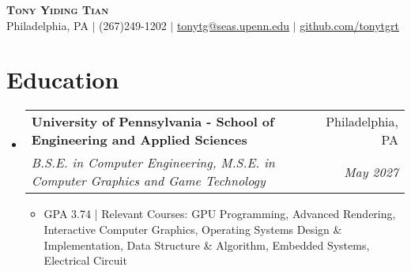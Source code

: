 \documentclass[letterpaper,11pt]{article}
\makeatletter
\newcommand{\resumeItem}[1]{
  \item\small{
    {#1 \vspace{-3pt}}
  }
}
\newcommand{\resumeSubheading}[4]{
  \vspace{-2pt}\item
    \begin{tabular*}{0.97\textwidth}[t]{l@{\extracolsep{\fill}}r}
      \textbf{#1} & #2 \\
      \textit{\small#3} & \textit{\small #4} \\
    \end{tabular*}\vspace{-7pt}
}
\newcommand{\resumeSubHeadingListStart}{\begin{itemize}[leftmargin=0.15in, label={}]}
\newcommand{\resumeSubHeadingListEnd}{\end{itemize}}
\newcommand{\resumeItemListStart}{\begin{itemize}}
\newcommand{\resumeItemListEnd}{\end{itemize}\vspace{-5pt}}
\makeatother
\begin{document}

\begin{center}
    \textbf{\Huge \scshape Tony Yiding Tian} \\ \vspace{1pt}
    \small Philadelphia, PA $|$ (267)249-1202 $|$ \href{mailto:tonytg@seas.upenn.edu}{\underline{tonytg@seas.upenn.edu}} $|$ 
    \href{https://github.com/tonytgrt}{\underline{github.com/tonytgrt}}
\end{center}


\section{Education}
  \resumeSubHeadingListStart
    \resumeSubheading
      {University of Pennsylvania - School of Engineering and Applied Sciences}{Philadelphia, PA}
      {B.S.E. in Computer Engineering, M.S.E. in Computer Graphics and Game Technology}{May 2027}
      \resumeItemListStart
        \resumeItem{GPA 3.74 | Relevant Courses: GPU Programming, Advanced Rendering, Interactive Computer Graphics, Operating Systems Design \& Implementation, Data Structure \& Algorithm, Embedded Systems, Electrical Circuit}
      \resumeItemListEnd
  \resumeSubHeadingListEnd


\end{document}

